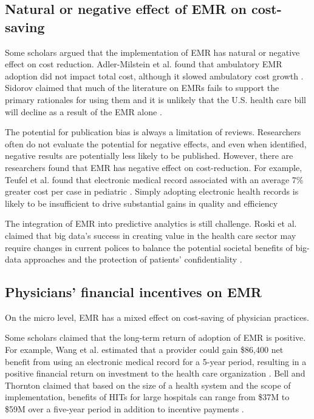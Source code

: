\subsection{Natural or negative effect of EMR on cost-saving}

Some scholars argued that the implementation of EMR has natural or negative effect on cost reduction. Adler-Milstein et al. found that ambulatory EMR adoption did not impact total cost, although it slowed ambulatory cost growth \citep{Adler-Milstein2013}. Sidorov claimed that much of the literature on EMRs fails to support the primary rationales for using them and it is unlikely that the U.S. health care bill will decline as a result of the EMR alone \citep{Sidorov2006}. 

The potential for publication bias is always a limitation of reviews. Researchers often do not evaluate the potential for negative effects, and even when identified, negative results are potentially less likely to be published. However, there are researchers found that EMR has negative effect on cost-reduction. For example, Teufel et al. found that electronic medical record associated with an average 7\% greater cost per case in pediatric \citep{Teufel2012}. Simply adopting electronic health records is likely to be insufficient to drive substantial gains in quality and efficiency \citep{DesRoches2010}

The integration of EMR into predictive analytics is still challenge. Roski et al. claimed that big data's success in creating value in the health care sector may require changes in current polices to balance the potential societal benefits of big-data approaches and the protection of patients' confidentiality \citep{Roski2014}.  


\subsection{Physicians' financial incentives on EMR}
On the micro level, EMR has a mixed effect on cost-saving of physician practices.

Some scholars claimed that the long-term return of adoption of EMR is positive. For example, Wang et al. estimated that a provider could gain \$86,400 net benefit from using an electronic medical record for a 5-year period, resulting in a positive financial return on investment to the health care organization \citep{Wang2003}. Bell and Thornton claimed that based on the size of a health system and the scope of implementation, benefits of HITs for large hospitals can range from \$37M to \$59M over a five-year period in addition to incentive payments \citep{Bell2011}.

